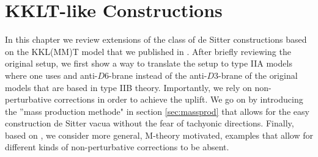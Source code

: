 \documentclass[a4paper,12pt]{report}
\begin{document}
\chapter{KKLT-like Constructions} %
\label{sec:kkltconstr}
In this chapter we review extensions of the class of de Sitter constructions based on the KKL(MM)T model \cite{Kachru:2003aw,Kachru:2003sx} that we published in \cite{Cribiori:2019bfx,Cribiori:2019drf,Cribiori:2019hrb}. After briefly reviewing the original setup, we first show a way to translate the setup to type IIA models \cite{Cribiori:2019bfx} where one uses and anti-$D6$-brane instead of the anti-$D3$-brane of the original models that are based in type IIB theory. Importantly, we rely on non-perturbative corrections in order to achieve the uplift. We go on by introducing the ''mass production methode" \cite{Cribiori:2019drf} in section \ref{sec:massprod} that allows for the easy construction de Sitter vacua without the fear of tachyonic directions. Finally, based on \cite{Cribiori:2019hrb}, we consider more general, M-theory motivated, examples that allow for different kinds of non-perturbative corrections to be absent.
\end{document}
